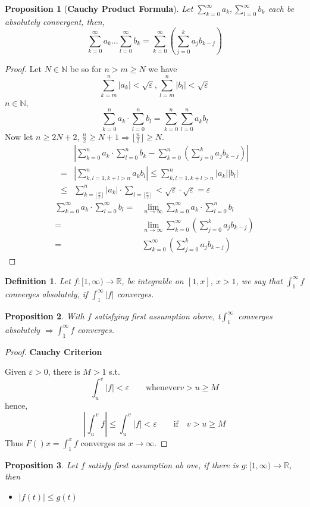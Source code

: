 \documentclass[12pt]{article}
\theoremstyle{plain}
\newtheorem{definition}{Definition}[subsection]
\newtheorem{proposition}{Proposition}[subsection]
\newcommand{\abs}[1]{\left| #1 \right|}
\newcommand{\floor}[1]{\lfloor #1 \rfloor}
\newcommand{\mN}{{\mathbb{N}}}
\newcommand{\mR}{{\mathbb{R}}}
\newcommand{\ep}{\varepsilon}
\begin{document}
\begin{proposition}[\textbf{Cauchy Product Formula}]
Let $\sum_{k=0}^{\infty} a_k, \sum_{l=0}^{\infty}b_k$ each be absolutely 
convergent, then,
\[
	\sum_{k=0}^{\infty} a_k \ldots \sum_{l=0}^{\infty}b_k
	= \sum_{k=0}^{\infty} (\sum_{j=0}^{k} a_jb_{k-j})
\]
\end{proposition}
\begin{proof}
	Let $N \in \mN$ be so for $n>m \geq N$ we have 
	\[
		\sum_{k=m}^n \abs{a_k} < \sqrt{\ep}, \sum_{l=m}^n \abs{b_l}<\sqrt{\ep}
	\]
	$n \in \mN$, 
	\[
		\sum_{k=0}^{n} a_k \cdot \sum_{l=0}^n b_l
		= \sum_{k=0}^n \sum_{l=0}^n a_kb_l
	\]
	Now let $n\geq 2N+2$, $\frac n2 \geq N+1\Rightarrow \floor{\frac n2}\geq N$.
	\begin{align*}
		& \abs{\sum_{k=0}^n a_k \cdot \sum_{l=0}^n b_k - \sum_{k=0}^{n}
		(\sum_{j=0}^k a_jb_{k-j})}	\\
		=& \abs{\sum_{k,l=1, k+l>n}^n a_kb_l}
		\leq \sum_{k,l=1, k+l>n}^n \abs{a_k}\abs{b_l}	\\
		\leq& \sum_{k=\floor{\frac n2}}^n \abs{a_k} \cdot 
		\sum_{l = \floor{\frac n2}} < \sqrt{\ep} \cdot \sqrt{\ep} = \ep
	\end{align*}
	\begin{align*}
		\sum_{k=0}^{\infty} a_k \cdot \sum_{l=0}^{\infty} b_l
		=& \lim_{n\to\infty} \sum_{k=0}^{\infty} a_k\cdot \sum_{l=0}^n b_l \\
		=& \lim_{n\to\infty} \sum_{k=0}^{\infty} (\sum_{j=0}^k a_j b_{k-j})	\\
		=& \sum_{k=0}^{\infty}(\sum_{j=0}^k a_j b_{k-j})
	\end{align*}
\end{proof}


\begin{definition}
	Let $f:[1,\infty) \to\mR$, be integrable on $[1,x]$, $x > 1$, we say that
	$\int_1^{\infty} f$ converges absolutely, if $\int_1^{\infty}\abs{f}$
	converges. \\
\end{definition}

\begin{proposition}
	With $f$ satisfying first assumption above, t$\int_1^{\infty}$ converges
	absolutely $\Rightarrow \int_1^{\infty} f$ converges. 
\end{proposition}
\begin{proof}\textbf{Cauchy Criterion}

	Given $\ep > 0$, there is $M > 1$ s.t. 
	\[
		\int_u^v \abs f < \ep \qquad 
		\text{whenever} v > u \geq M
	\]
	hence, 
	\[
		\abs{\int_u^v f} \leq \int_u^v \abs{f} < \ep
		\qquad 
		\text{if}
		\quad 
		v > u \geq M
	\]
	Thus $F()x = \int_1^x f$ converges as $x \to \infty$.
\end{proof}

\begin{proposition}
	Let $f$ satisfy first assumption ab ove, if there is $g:[1,\infty) \to
	\mR$, then 
	\begin{itemize}
		\item $\abs{f(t)} \leq g(t)$
	\end{itemize}
\end{proposition}
\end{document}
